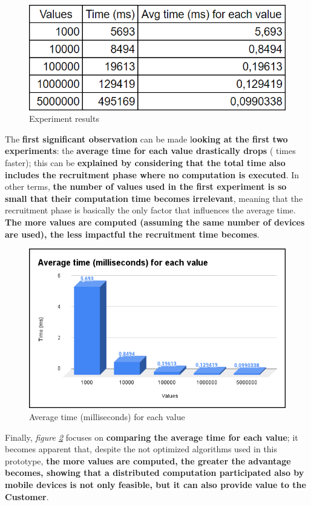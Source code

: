 \begin{figure}[!ht]
    \centering
    \includegraphics[scale=0.55]{document/chapters/chapter_6/images/experiment_results.png}
    \caption{Experiment results}
    \label{fig:experiment_results}
\end{figure}

The \textbf{first significant observation} can be made l\textbf{ooking at the first two experiments}: the \textbf{average time for each value drastically drops} ( times faster); this can be \textbf{explained by considering that the total time also includes the recruitment phase where no computation is executed}. In other terms, \textbf{the number of values used in the first experiment is so small that their computation time becomes irrelevant}, meaning that the recruitment phase is basically the only factor that influences the average time. \textbf{The more values are computed (assuming the same number of devices are used), the less impactful the recruitment time becomes}.

\begin{figure}[!ht]
    \centering
    \includegraphics[scale=0.55]{document/chapters/chapter_6/images/experiment_results_avg_ms_per_value.png}
    \caption{Average time (milliseconds) for each value}
    \label{fig:experiment_results_avg_ms_per_value}
\end{figure}

Finally, \textit{figure \ref{fig:experiment_results_avg_ms_per_value}} focuses on \textbf{comparing the average time for each value}; it becomes apparent that, despite the not optimized algorithms used in this prototype, \textbf{the more values are computed, the greater the advantage becomes, showing that a distributed computation participated also by mobile devices is not only feasible, but it can also provide value to the Customer}.
